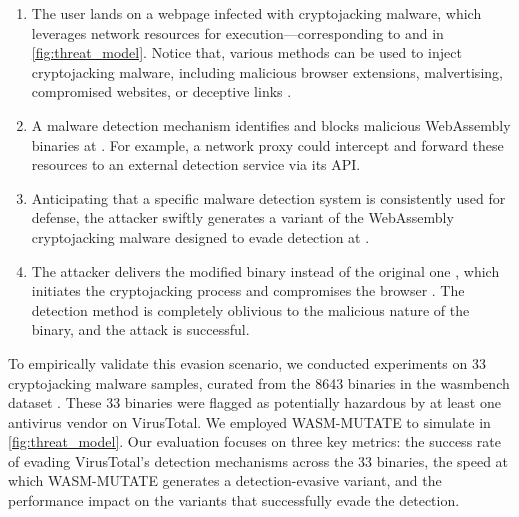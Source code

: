 \begin{enumerate}
    
    \item The user lands on a webpage infected with cryptojacking malware, which leverages network resources for execution—corresponding to  and  in \autoref{fig:threat_model}. 
    Notice that, various methods can be used to inject cryptojacking malware, including malicious browser extensions, malvertising, compromised websites, or deceptive links \cite{9566204}.
    
    \item A malware detection mechanism identifies and blocks malicious WebAssembly binaries at . 
    For example, a network proxy could intercept and forward these resources to an external detection service via its API.
    
    \item Anticipating that a specific malware detection system is consistently used for defense, the attacker swiftly generates a variant of the WebAssembly cryptojacking malware designed to evade detection at .
    
    \item The attacker delivers the modified binary instead of the original one , which initiates the cryptojacking process and compromises the browser . The detection method is completely oblivious to the malicious nature of the binary, and the attack is successful.
    
\end{enumerate}

To empirically validate this evasion scenario, we conducted experiments on 33 cryptojacking malware samples, curated from the 8643 binaries in the wasmbench dataset \cite{Hilbig2021AnES}. 
These 33 binaries were flagged as potentially hazardous by at least one antivirus vendor on VirusTotal. 
We employed WASM-MUTATE to simulate  in \autoref{fig:threat_model}. 
Our evaluation focuses on three key metrics: the success rate of evading VirusTotal's detection mechanisms across the 33 binaries, the speed at which WASM-MUTATE generates a detection-evasive variant, and the performance impact on the variants that successfully evade the detection.








